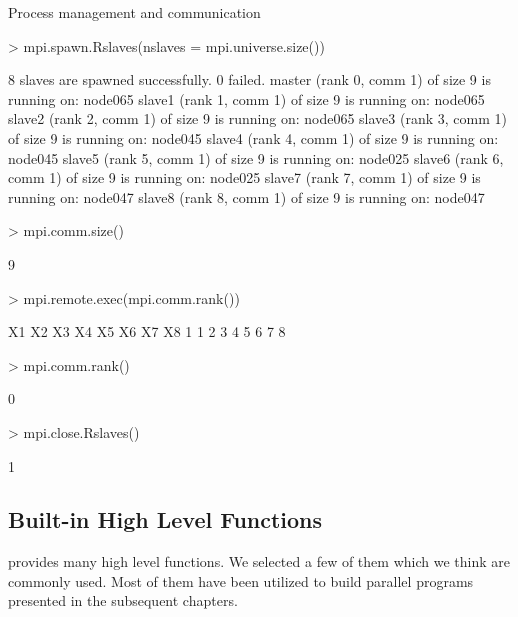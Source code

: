 \begin{Example} Process management and communication 

\begin{Schunk}
\begin{Sinput}
> mpi.spawn.Rslaves(nslaves = mpi.universe.size())
\end{Sinput}
\begin{Soutput}
	8 slaves are spawned successfully. 0 failed.
master (rank 0, comm 1) of size 9 is running on: node065 
slave1 (rank 1, comm 1) of size 9 is running on: node065 
slave2 (rank 2, comm 1) of size 9 is running on: node065 
slave3 (rank 3, comm 1) of size 9 is running on: node045 
slave4 (rank 4, comm 1) of size 9 is running on: node045 
slave5 (rank 5, comm 1) of size 9 is running on: node025 
slave6 (rank 6, comm 1) of size 9 is running on: node025 
slave7 (rank 7, comm 1) of size 9 is running on: node047 
slave8 (rank 8, comm 1) of size 9 is running on: node047 
\end{Soutput}
\begin{Sinput}
> mpi.comm.size()
\end{Sinput}
\begin{Soutput}
[1] 9
\end{Soutput}
\begin{Sinput}
> mpi.remote.exec(mpi.comm.rank())
\end{Sinput}
\begin{Soutput}
  X1 X2 X3 X4 X5 X6 X7 X8
1  1  2  3  4  5  6  7  8
\end{Soutput}
\begin{Sinput}
> mpi.comm.rank()
\end{Sinput}
\begin{Soutput}
[1] 0
\end{Soutput}
\begin{Sinput}
> mpi.close.Rslaves()
\end{Sinput}
\begin{Soutput}
[1] 1
\end{Soutput}
\end{Schunk}
\label{ex:Rmpi2}
\end{Example}
 
\subsection{Built-in High Level Functions}

 provides many high level functions. We selected a few
of them which we think are commonly used. Most of them have been
utilized to build parallel programs presented in the subsequent
chapters.

